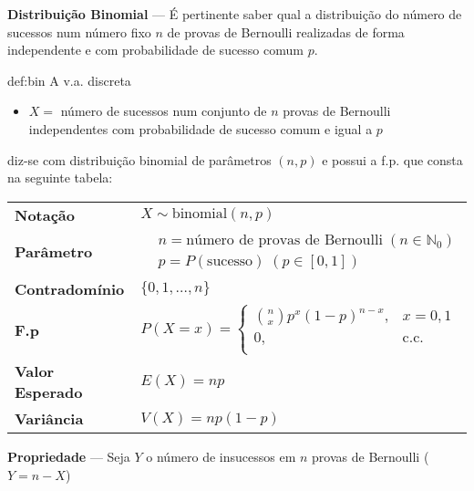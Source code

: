 \newpage
\noindent \textbf{Distribuição Binomial} --- É pertinente saber qual a distribuição do número de sucessos num número fixo $n$ de provas de Bernoulli realizadas de forma independente e com probabilidade de sucesso comum $p$.

\begin{theo}{def:bin}\label{def:bin}
\noindent A v.a. discreta

\begin{itemize}
    \item $X =$ número de sucessos num conjunto de $n$ provas de Bernoulli independentes com probabilidade de sucesso comum e igual a $p$
\end{itemize}

\noindent diz-se com distribuição binomial de parâmetros $(n,p)$ e possui a f.p. que consta na seguinte tabela:

\vspace{1 em}
\begin{center}
\begin{tabular}{p{4cm}p{8cm}}
\toprule
\textbf{Notação} & $X \sim \text{binomial}(n,p)$\\
\addlinespace
\textbf{Parâmetro} & $\begin{aligned}
                            &n = \text{número de provas de Bernoulli}\; (n \in \mathbb{N}_0)\\
                            &p = P(\text{sucesso})\; (p \in [0,1])
                     \end{aligned}$\\
\addlinespace
\textbf{Contradomínio} & $\{0,1, \dots, n\}$\\
\addlinespace
\textbf{F.p} & $P(X = x)= \left\{
                                \begin{array}{ll}
                                      \binom{n}{x}p^x(1 - p)^{n-x}, & x = 0,1\\
                                       0, & \text{c.c.}\\
                                \end{array} 
                          \right.$\\
\addlinespace
\textbf{Valor Esperado} & $E(X) = np$\\
\addlinespace
\textbf{Variância} & $V(X) = np(1 - p)$\\
\bottomrule
\end{tabular}
\end{center}

\vspace{1 em}
\noindent \textbf{Propriedade} --- Seja $Y$ o número de insucessos em $n$ provas de Bernoulli ($Y = n - X$)


\end{theo}
